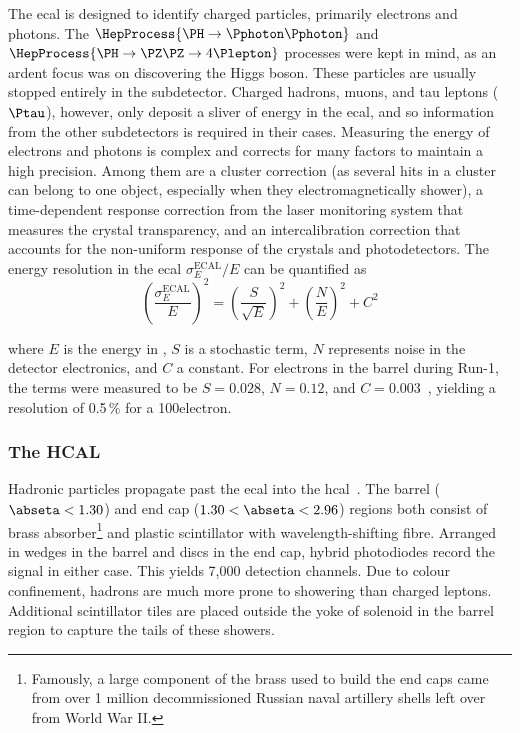 The \acrshort{ecal} is designed to identify charged particles, primarily electrons and photons. The $\HepProcess{\PH \to \Pphoton\Pphoton}$ and $\HepProcess{\PH \to \PZ\PZ \to 4\Plepton}$ processes were kept in mind, as an ardent focus was on discovering the Higgs boson. These particles are usually stopped entirely in the subdetector. Charged hadrons, muons, and tau leptons ($\Ptau$), however, only deposit a sliver of energy in the \acrshort{ecal}, and so information from the other subdetectors is required in their cases. Measuring the energy of electrons and photons is complex and corrects for many factors to maintain a high precision. Among them are a cluster correction (as several hits in a cluster can belong to one object, especially when they electromagnetically shower), a time-dependent response correction from the laser monitoring system that measures the crystal transparency, and an intercalibration correction that accounts for the non-uniform response of the crystals and photodetectors. The energy resolution in the \acrshort{ecal} $\sigma_E^{\mathrm{ECAL}} / E$ can be quantified as
\begin{equation}
    (\frac{\sigma_E^{\mathrm{ECAL}}}{E})^2 = (\frac{S}{\sqrt{E}})^2 + (\frac{N}{E})^2 + C^2
\end{equation}

where $E$ is the energy in \GeVns, $S$ is a stochastic term, $N$ represents noise in the detector electronics, and $C$ a constant. For electrons in the barrel during Run-1, the terms were measured to be $S = \text{0.028}$, $N = \text{0.12}$, and $C = \text{0.003}$~\cite{Ingram_2007}, yielding a resolution of 0.5\,\% for a 100\GeV electron.





\subsubsection{The HCAL}
\label{subsubsec:cms_hcal}

Hadronic particles propagate past the \acrshort{ecal} into the \acrshort{hcal}~\cite{CERN-LHCC-97-031}. The barrel ($\abseta < \text{1.30}$) and end cap ($\text{1.30} < \abseta < \text{2.96}$) regions both consist of brass absorber\footnote{Famously, a large component of the brass used to build the end caps came from over 1 million decommissioned Russian naval artillery shells left over from World War II.} and plastic scintillator with wavelength-shifting fibre. Arranged in wedges in the barrel and discs in the end cap, hybrid photodiodes record the signal in either case. This yields 7,000 detection channels. Due to colour confinement, hadrons are much more prone to showering than charged leptons. Additional scintillator tiles are placed outside the yoke of solenoid in the barrel region to capture the tails of these showers.

